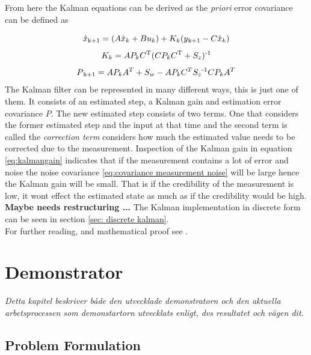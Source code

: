 \documentclass[a4paper,11pt]{kth-mag}
\begin{document}
From here the Kalman equations can be derived as 
the \textit{priori} error covariance can be defined as
\


 
\begin{equation} \label{eq:estimated state}
\hat{x}\textsubscript{k+1} = (A\hat{x}_k+Bu_k)+K_k(y\textsubscript{k+1}-C\hat{x}_k)
\end{equation}
\begin{equation} \label{eq:kalmangain}
K_k = AP_kC \textsuperscript{T}(CP_kC \textsuperscript{T} + S_z) \textsuperscript{-1}
\end{equation}
\begin{equation} \label{eq:kalman P}
P \textsubscript{k+1} = AP_kA^T+S_w-AP_kC^TS_z\textsuperscript{-1}CP_kA^T
\end{equation}
The Kalman filter can be represented in many different ways, this is just one of them. It consists of an estimated step, a Kalman gain and  estimation error covariance $P$.
The new estimated step consists of two terms. One that considers the former estimated step and the input at that time and the second term is called the \textit{correction term} considers how much the estimated value needs to be corrected due to the measurement. 
Inspection of the Kalman gain in equation \eqref{eq:kalmangain} indicates that if the measurement contains a lot of error and noise the noise covariance \eqref{eq:covariance measurement noise} will be large hence the Kalman gain will be small. That is if the credibility of the measurement is low, it wont effect the estimated state as much as if the credibility would be high. \textbf{Maybe needs restructuring ...} 
The Kalman implementation in discrete form can be seen in section \ref{sec: discrete kalman}.
\\
For further reading, and mathematical proof see \cite{Kalmanintro}.

 
\chapter{Demonstrator}
\emph{Detta kapitel beskriver både den utvecklade demonstratorn och den aktuella arbetsprocessen som demonstartorn utvecklats enligt, dvs resultatet och vägen dit.}


\section{Problem Formulation}
\end{document}
